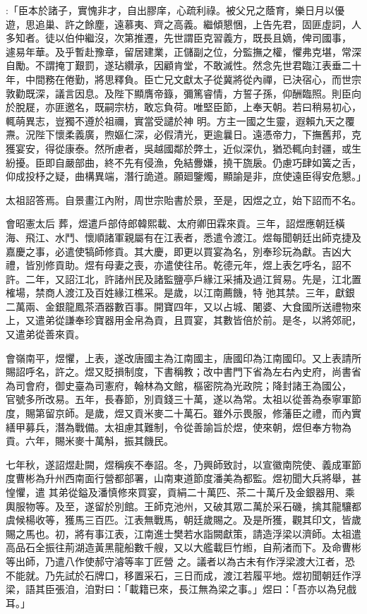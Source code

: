 \begin{pinyinscope}
 :「臣本於諸子，實愧非才，自出膠庠，心疏利祿。被父兄之蔭育，樂日月以優遊，思追巢、許之餘塵，遠慕夷、齊之高義。繼傾懇悃，上告先君，固匪虛詞，人多知者。徒以伯仲繼沒，次第推遷，先世謂臣克習義方，既長且嫡，俾司國事，
 遽易年華。及乎暫赴豫章，留居建業，正儲副之位，分監撫之權，懼弗克堪，常深自勵。不謂掩丁艱罰，遂玷纘承，因顧肯堂，不敢滅性。然念先世君臨江表垂二十年，中間務在倦勤，將思釋負。臣亡兄文獻太子從冀將從內禪，已決宿心，而世宗敦勸既深，議言因息。及陛下顯膺帝籙，彌篤睿情，方誓子孫，仰酬臨照。則臣向於脫屣，亦匪邀名，既嗣宗枋，敢忘負荷。唯堅臣節，上奉天朝。若曰稍易初心，輒萌異志，豈獨不遵於祖禰，實當受譴於神
 明。方主一國之生靈，遐賴九天之覆燾。況陛下懷柔義廣，煦嫗仁深，必假清光，更逾曩日。遠憑帝力，下撫舊邦，克獲宴安，得從康泰。然所慮者，吳越國鄰於弊土，近似深仇，猶恐輒向封疆，或生紛擾。臣即自嚴部曲，終不先有侵漁，免結釁嫌，撓干旒扆。仍慮巧肆如簧之舌，仰成投杼之疑，曲構異端，潛行詭道。願廻鑒燭，顯諭是非，庶使遠臣得安危懇。」



 太祖詔答焉。自景畫江內附，周世宗貽書於景，至是，因煜之立，始下詔而不名。



 會昭憲太后
 葬，煜遣戶部侍郎韓熙載、太府卿田霖來貢。三年，詔煜應朝廷橫海、飛江、水鬥、懷順諸軍親屬有在江表者，悉遣令渡江。煜每聞朝廷出師克捷及嘉慶之事，必遣使犒師修貢。其大慶，即更以買宴為名，別奉珍玩為獻。吉凶大禮，皆別修貢助。煜有母妻之喪，亦遣使往吊。乾德元年，煜上表乞呼名，詔不許。二年，又詔江北，許諸州民及諸監鹽亭戶緣江采捕及過江貿易。先是，江北置榷場，禁商人渡江及百姓緣江樵采。是歲，以江南薦饑，特
 弛其禁。三年，獻銀二萬兩、金銀龍鳳茶酒器數百事。開寶四年，又以占城、闍婆、大食國所送禮物來上，又遣弟從謙奉珍寶器用金帛為貢，且買宴，其數皆倍於前。是冬，以將郊祀，又遣弟從善來貢。



 會嶺南平，煜懼，上表，遂改唐國主為江南國主，唐國印為江南國印。又上表請所賜詔呼名，許之。煜又貶損制度，下書稱教；改中書門下省為左右內史府，尚書省為司會府，御史臺為司憲府，翰林為文館，樞密院為光政院；降封諸王為國公，
 官號多所改易。五年，長春節，別貢錢三十萬，遂以為常。太祖以從善為泰寧軍節度，賜第留京師。是歲，煜又貢米麥二十萬石。雖外示畏服，修藩臣之禮，而內實繕甲募兵，潛為戰備。太祖慮其難制，令從善諭旨於煜，使來朝，煜但奉方物為貢。六年，賜米麥十萬斛，振其饑民。



 七年秋，遂詔煜赴闕，煜稱疾不奉詔。冬，乃興師致討，以宣徽南院使、義成軍節度曹彬為升州西南面行營都部署，山南東道節度潘美為都監。煜初聞大兵將舉，甚惶懼，遣
 其弟從鎰及潘慎修來買宴，貢絹二十萬匹、茶二十萬斤及金銀器用、乘輿服物等。及至，遂留於別館。王師克池州，又破其眾二萬於采石磯，擒其龍驤都虞候楊收等，獲馬三百匹。江表無戰馬，朝廷歲賜之。及是所獲，觀其印文，皆歲賜之馬也。初，將有事江表，江南進士樊若水詣闕獻策，請造浮梁以濟師。太祖遣高品石全振往荊湖造黃黑龍船數千艘，又以大艦載巨竹縆，自荊渚而下。及命曹彬等出師，乃遣八作使郝守濬等率丁匠營
 之。議者以為古未有作浮梁渡大江者，恐不能就。乃先試於石牌口，移置采石，三日而成，渡江若履平地。煜初聞朝廷作浮梁，語其臣張洎，洎對曰：「載籍已來，長江無為梁之事。」煜曰：「吾亦以為兒戲耳。」




\end{pinyinscope}
